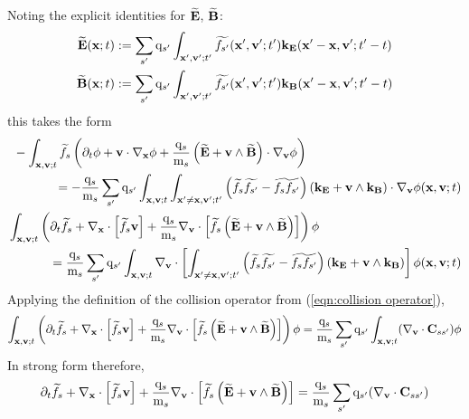     Noting the explicit identities for $\widetilde{\mathbf{E}}$, $\widetilde{\mathbf{B}}$:
    \begin{align}
        \widetilde{\mathbf{E}}(\mathbf{x}; t)  &:=  \sum_{s'}\mathrm{q}_{s'}\int_{\mathbf{x}', \mathbf{v}'; t'}\widetilde{f_{s'}}(\mathbf{x}', \mathbf{v}'; t')\mathbf{k}_{\mathbf{E}}(\mathbf{x}' - \mathbf{x}, \mathbf{v}'; t' - t)  \\
        \widetilde{\mathbf{B}}(\mathbf{x}; t)  &:=  \sum_{s'}\mathrm{q}_{s'}\int_{\mathbf{x}', \mathbf{v}'; t'}\widetilde{f_{s'}}(\mathbf{x}', \mathbf{v}'; t')\mathbf{k}_{\mathbf{B}}(\mathbf{x}' - \mathbf{x}, \mathbf{v}'; t' - t)
    \end{align}
    this takes the form
    \begin{align}
        \begin{split}
            &- \int_{\mathbf{x}, \mathbf{v}; t}\widetilde{f_{s}}\left(\partial_{t}\phi + \mathbf{v}\cdot\nabla_{\mathbf{x}}\phi + \frac{\mathrm{q}_{s}}{\mathrm{m}_{s}}\left(\widetilde{\mathbf{E}} + \mathbf{v}\wedge\widetilde{\mathbf{B}}\right)\cdot\nabla_{\mathbf{v}}\phi\right)  \\
            &\;\;\;\;\;\;\;\;\;\;\;\;=  - \frac{\mathrm{q}_{s}}{\mathrm{m}_{s}}\sum_{s'}\mathrm{q}_{s'}\int_{\mathbf{x}, \mathbf{v}; t}\int_{\mathbf{x}' \neq \mathbf{x}, \mathbf{v}'; t'}\left(\widetilde{f_{s}}\widetilde{f_{s'}} - \widetilde{f_{s}f_{s'}}\right)(\mathbf{k}_{\mathbf{E}}  + \mathbf{v}\wedge\mathbf{k}_{\mathbf{B}})\cdot\nabla_{\mathbf{v}}\phi(\mathbf{x}, \mathbf{v}; t)
        \end{split}  \\
        \begin{split}
          &\int_{\mathbf{x}, \mathbf{v}; t}\left(\partial_{t}\widetilde{f_{s}} + \nabla_{\mathbf{x}}\cdot\left[\widetilde{f_{s}}\mathbf{v}\right] + \frac{\mathrm{q}_{s}}{\mathrm{m}_{s}}\nabla_{\mathbf{v}}\cdot\left[\widetilde{f_{s}}\left(\widetilde{\mathbf{E}} + \mathbf{v}\wedge\widetilde{\mathbf{B}}\right)\right]\right)\phi  \\
          &\;\;\;\;\;\;\;\;\;\;\;\;=  \frac{\mathrm{q}_{s}}{\mathrm{m}_{s}}\sum_{s'}\mathrm{q}_{s'}\int_{\mathbf{x}, \mathbf{v}; t}\nabla_{\mathbf{v}}\cdot\left[\int_{\mathbf{x}' \neq \mathbf{x}, \mathbf{v}'; t'}\left(\widetilde{f_{s}}\widetilde{f_{s'}} - \widetilde{f_{s}f_{s'}}\right)(\mathbf{k}_{\mathbf{E}}  + \mathbf{v}\wedge\mathbf{k}_{\mathbf{B}})\right]\phi(\mathbf{x}, \mathbf{v}; t)
        \end{split}
    \end{align}
    Applying the definition of the collision operator from (\ref{eqn:collision operator}),
    \begin{equation}
        \int_{\mathbf{x}, \mathbf{v}; t}\left(\partial_{t}\widetilde{f_{s}} + \nabla_{\mathbf{x}}\cdot\left[\widetilde{f_{s}}\mathbf{v}\right] + \frac{\mathrm{q}_{s}}{\mathrm{m}_{s}}\nabla_{\mathbf{v}}\cdot\left[\widetilde{f_{s}}\left(\widetilde{\mathbf{E}} + \mathbf{v}\wedge\widetilde{\mathbf{B}}\right)\right]\right)\phi  =  \frac{\mathrm{q}_{s}}{\mathrm{m}_{s}}\sum_{s'}\mathrm{q}_{s'}\int_{\mathbf{x}, \mathbf{v}; t}(\nabla_{\mathbf{v}}\cdot\mathbf{C}_{ss'})\phi
    \end{equation}
    In strong form therefore,
    \begin{equation}
        \partial_{t}\widetilde{f_{s}} + \nabla_{\mathbf{x}}\cdot\left[\widetilde{f_{s}}\mathbf{v}\right] + \frac{\mathrm{q}_{s}}{\mathrm{m}_{s}}\nabla_{\mathbf{v}}\cdot\left[\widetilde{f_{s}}\left(\widetilde{\mathbf{E}} + \mathbf{v}\wedge\widetilde{\mathbf{B}}\right)\right]  =  \frac{\mathrm{q}_{s}}{\mathrm{m}_{s}}\sum_{s'}\mathrm{q}_{s'}(\nabla_{\mathbf{v}}\cdot\mathbf{C}_{ss'})
    \end{equation}

    